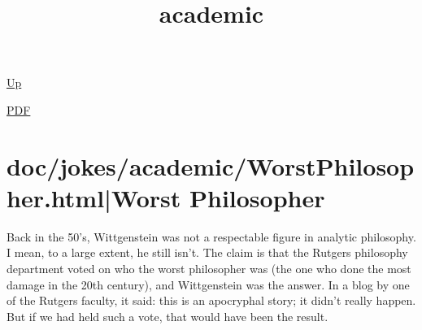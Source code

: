 \documentclass[12pt,a4paper]{report}
\begin{document}
 \href{doc/jokes.html}{Up} 

 \href{doc/jokes/academic.pdf}{PDF} 
\title{academic}

\tableofcontents

\part{doc/jokes/academic/WorstPhilosopher.html|Worst Philosopher}
Back in the 50's, Wittgenstein was not a respectable figure in analytic
philosophy. I mean, to a large extent, he still isn't. The claim is that the
Rutgers philosophy department voted on who the worst philosopher was (the one
who done the most damage in the 20th century), and Wittgenstein was the answer.
In a blog by one of the Rutgers faculty, it said: this is an apocryphal story;
it didn't really happen. But if we had held such a vote, that would have been
the result.
\end{document}

